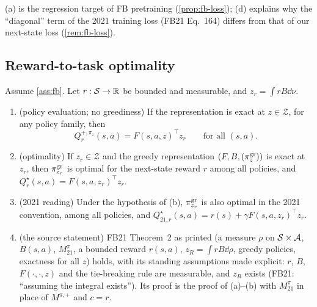 (a) is the regression target of FB pretraining (\cref{prop:fb-loss}); (d) explains why the ``diagonal'' term of the 2021 training loss (FB21 Eq.~164) differs from that of our next-state loss (\cref{rem:fb-loss}).

\subsection{Reward-to-task optimality}\label{sec:fb-opt}

\begin{theorem}\label{thm:fb-opt}
Assume \cref{ass:fb}. Let $r:\mathcal{S}\to\mathbb{R}$ be bounded and measurable, and $z_r=\int rB\dd\nu$.
\begin{enumerate}[nosep,label=(\alph*)]
\item (policy evaluation; no greediness) If the representation is exact at $z\in\mathcal Z$, for any policy family, then
  \[Q^{+,\pi_z}_r(s,a)=F(s,a,z)^\top z_r\qquad\text{for all }(s,a).\]
\item (optimality) If $z_r\in\mathcal Z$ and the greedy representation $(F,B,(\pi^{\mathrm{gr}}_z))$ is exact at $z_r$, then $\pi^{\mathrm{gr}}_{z_r}$ is optimal for the next-state reward $r$ among all policies, and $Q^\star_r(s,a)=F(s,a,z_r)^\top z_r$.
\item (2021 reading) Under the hypothesis of (b), $\pi^{\mathrm{gr}}_{z_r}$ is also optimal in the 2021 convention, among all policies, and $Q^\star_{21,r}(s,a)=r(s)+\gamma F(s,a,z_r)^\top z_r$.
\item (the source statement) FB21 Theorem~2 as printed (a measure $\rho$ on $\mathcal{S}\times\mathcal{A}$, $B(s,a)$, $M^\pi_{21}$, a bounded reward $r(s,a)$, $z_R=\int rB\dd\rho$, greedy policies, exactness for all $z$) holds, with its standing assumptions made explicit: $r$, $B$, $F(\cdot,\cdot,z)$ and the tie-breaking rule are measurable, and $z_R$ exists (FB21: ``assuming the integral exists'').
  Its proof is the proof of (a)--(b) with $M^\pi_{21}$ in place of $M^{\pi,+}$ and $c=r$.
\end{enumerate}
\end{theorem}
